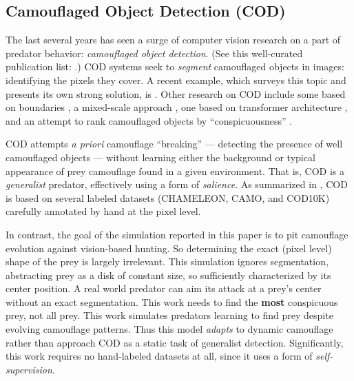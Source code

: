 \documentclass[acmtog,
    anonymous,
    review
    ]{acmart}
\newcommand{\jargon}[1]{\textit{#1}}
\begin{document}
\subsection{Camouflaged Object Detection (COD)}
The last several years has seen a surge of computer vision research on a part of predator behavior: \jargon{camouflaged object detection}. (See this well-curated publication list: \citet{visionxiang_cod}.) COD systems seek to \jargon{segment} camouflaged objects in images: identifying the pixels they cover. A recent example, which surveys this topic and presents its own strong solution, is \citet{Zhang2022}. Other research on COD include some based on boundaries \cite{chen_boundary-guided_2022} \cite{sun_boundary-guided_2022}, a mixed-scale approach \cite{pang_zoom_2022}, one based on transformer architecture \cite{yin_camoformer_2022}, and an attempt to rank camouflaged objects by “conspicuousness” \cite{lv_cod_2022}.
\par
COD attempts \textit{a priori} camouflage “breaking” — detecting the presence of well camouflaged objects — without learning either the background or typical appearance of prey camouflage found in a given environment. That is, COD is a \jargon{generalist} predator, effectively using a form of \jargon{salience}. As summarized in \citet{Zhang2022}, COD is based on several labeled datasets (CHAMELEON, CAMO, and COD10K) carefully annotated by hand at the pixel level.
\par
In contrast, the goal of the simulation reported in this paper is to pit camouflage evolution against vision-based hunting. So determining the exact (pixel level) shape of the prey is largely irrelevant. This simulation ignores segmentation, abstracting prey as a disk of constant size, so sufficiently characterized by its center position. A real world predator can aim its attack at a prey's center without an exact segmentation. This work needs to find the \textbf{most} conspicuous prey, not all prey. This work simulates predators learning to find prey despite evolving camouflage patterns. Thus this model \jargon{adapts} to dynamic camouflage rather than approach COD as a static task of generalist detection. Significantly, this work requires no hand-labeled datasets at all, since it uses a form of \jargon{self-supervision}.
\par

\end{document}
